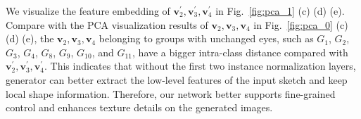 
We visualize the feature embedding of $\boldsymbol{v}_2^{'},\boldsymbol{v}^{'}_3, \boldsymbol{v}_4^{'}$ in Fig.~\ref{fig:pca_1} (c) (d) (e). 
Compare with the PCA visualization results of $\boldsymbol{v}_2,\boldsymbol{v}_3,\boldsymbol{v}_4$ in 
Fig.~\ref{fig:pca_0} (c) (d) (e), the $\boldsymbol{v}_2, \boldsymbol{v}_3, \boldsymbol{v}_4$ belonging to groups with unchanged eyes, such as $G_1$, $G_2$, $G_3$, $G_4$, $G_8$, $G_9$, $G_{10}$, and $G_{11}$, have a bigger intra-class distance compared with $\boldsymbol{v}_2^{'}, \boldsymbol{v}_3^{'}, \boldsymbol{v}_4^{'}$. 
This indicates that without the first two instance normalization layers, generator can better extract the low-level features of the input sketch and keep local shape information. 
Therefore, our network better supports fine-grained control and enhances texture details on the generated images.

